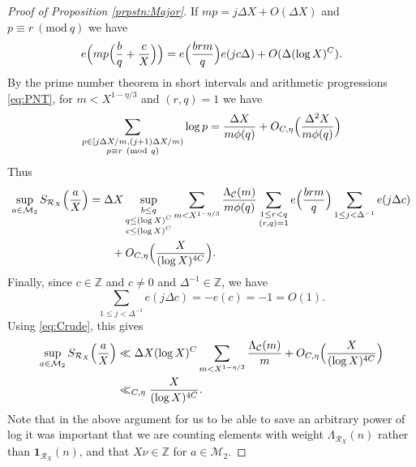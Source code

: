\documentclass[10pt]{amsart}
\theoremstyle{plain}
\numberwithin{sblmm}{thrm}
\numberwithin{equation}{section}
\newcommand{\Mod}[1]{\ (\mathrm{mod}\ #1)}
\begin{document}
\begin{proof}[Proof of Proposition \ref{prpstn:Major}]
If $mp=j\Delta X+O(\Delta X)$ and $p\equiv r\Mod{q}$ we have
\[
e\Bigl(mp\Bigl(\frac{b}{q}+\frac{c}{X}\Bigr)\Bigr)= e\Bigl(\frac{b r m}{q}\Bigr)e(j c\Delta)+O(\Delta (\log{X})^C).
\]
By the prime number theorem in short intervals and arithmetic progressions \eqref{eq:PNT}, for $m<X^{1-\eta/3}$ and $(r,q)=1$ we have
\[
\sum_{\substack{p\in[j\Delta X/m,(j+1)\Delta X/m) \\ p\equiv r\Mod{q}}}\log{p}=\frac{\Delta X}{m\phi(q)}+O_{C,\eta}\Bigl(\frac{\Delta^2 X}{m\phi(q)}\Bigr)
\]
Thus
\begin{align*}
\sup_{a\in\mathcal{M}_2}S_{\mathcal{R}_X}\Bigl(\frac{a}{X}\Bigr)
&=\Delta X\sup_{\substack{b\le q\\ q\le (\log{X})^C \\ c\le (\log{X})^C}}\sum_{m<X^{1-\eta/3}}\frac{\Lambda_{\mathcal{C}}(m)}{m\phi(q)}
\sum_{\substack{1\le r<q\\ (r,q)=1}} e\Bigl(\frac{b r m}{q}\Bigr)\sum_{1\le j< \Delta^{-1}} e(j\Delta c)\\
&\qquad+O_{C,\eta}\Bigl(\frac{X}{(\log{X})^{4C}}\Bigr).
\end{align*}
%
Finally, since $c\in\mathbb{Z}$ and $c\ne 0$ and $\Delta^{-1}\in\mathbb{Z}$, we have
\[
\sum_{1\le j< \Delta^{-1}}e(j\Delta c)=-e(c)=-1=O(1).
\]
Using \eqref{eq:Crude}, this gives
\begin{align}
\sup_{a\in\mathcal{M}_2}S_{\mathcal{R}_X}\Bigl(\frac{a}{X}\Bigr)&\ll\Delta X (\log{X})^C\sum_{m<X^{1-\eta/3}}\frac{\Lambda_{\mathcal{C}}(m)}{m}+O_{C,\eta}\Bigl(\frac{X}{(\log{X})^{4C}}\Bigr)\nonumber\\
&\ll_{C,\eta} \frac{X}{(\log{X})^{4C}}.\label{eq:M2Bound}
\end{align}
%
Note that in the above argument for us to be able to save an arbitrary power of log it was important that we are counting elements with weight $\Lambda_{\mathcal{R}_X}(n)$ rather than $\mathbf{1}_{\mathcal{R}_X}(n)$, and that $X\nu\in\mathbb{Z}$ for $a\in\mathcal{M}_2$. 


\end{proof}
\end{document}

